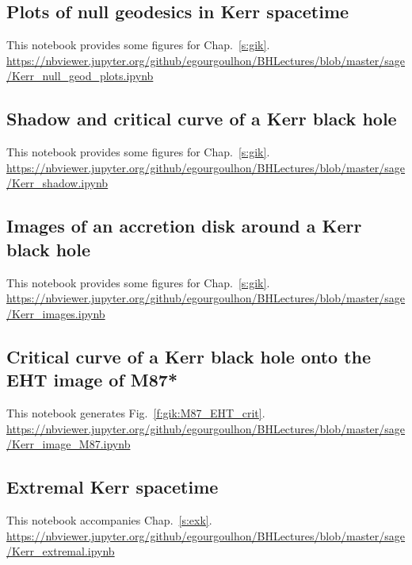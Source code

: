 \subsection{Plots of null geodesics in Kerr spacetime} \label{s:sam:Kerr_null_geod_plots}

This notebook provides some figures for Chap.~\ref{s:gik}.\\[1ex]
{\footnotesize
\url{https://nbviewer.jupyter.org/github/egourgoulhon/BHLectures/blob/master/sage/Kerr_null_geod_plots.ipynb}
}

\subsection{Shadow and critical curve of a Kerr black hole} \label{s:sam:Kerr_shadow}

This notebook provides some figures for Chap.~\ref{s:gik}.\\[1ex]
{\footnotesize
\url{https://nbviewer.jupyter.org/github/egourgoulhon/BHLectures/blob/master/sage/Kerr_shadow.ipynb}
}

\subsection{Images of an accretion disk around a Kerr black hole} \label{s:sam:Kerr_images}

This notebook provides some figures for Chap.~\ref{s:gik}.\\[1ex]
{\footnotesize
\url{https://nbviewer.jupyter.org/github/egourgoulhon/BHLectures/blob/master/sage/Kerr_images.ipynb}
}

\subsection{Critical curve of a Kerr black hole onto the EHT image of M87*} \label{s:sam:Kerr_image_M87}

This notebook generates Fig.~\ref{f:gik:M87_EHT_crit}.\\[1ex]
{\footnotesize
\url{https://nbviewer.jupyter.org/github/egourgoulhon/BHLectures/blob/master/sage/Kerr_image_M87.ipynb}
}


\subsection{Extremal Kerr spacetime} \label{s:sam:Kerr_extremal}

This notebook accompanies Chap.~\ref{s:exk}.\\[1ex]
{\footnotesize
\url{https://nbviewer.jupyter.org/github/egourgoulhon/BHLectures/blob/master/sage/Kerr_extremal.ipynb}
}

